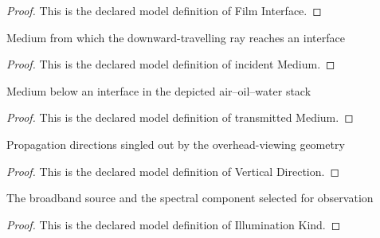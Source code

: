 \begin{proof}
  This is the declared model definition of Film Interface.
\end{proof}
\begin{definition}
  \label{def:physics:phyx-mini-0084:phyxminiproblems-problemphyxmini0084-filminterface-incidentmedium}
  Medium from which the downward-travelling ray reaches an interface
\end{definition}
\begin{proof}
  This is the declared model definition of incident Medium.
\end{proof}
\begin{definition}
  \label{def:physics:phyx-mini-0084:phyxminiproblems-problemphyxmini0084-filminterface-transmittedmedium}
  Medium below an interface in the depicted air--oil--water stack
\end{definition}
\begin{proof}
  This is the declared model definition of transmitted Medium.
\end{proof}
\begin{definition}
  \label{def:physics:phyx-mini-0084:phyxminiproblems-problemphyxmini0084-verticaldirection}
  Propagation directions singled out by the overhead-viewing geometry
\end{definition}
\begin{proof}
  This is the declared model definition of Vertical Direction.
\end{proof}
\begin{definition}
  \label{def:physics:phyx-mini-0084:phyxminiproblems-problemphyxmini0084-illuminationkind}
  The broadband source and the spectral component selected for observation
\end{definition}
\begin{proof}
  This is the declared model definition of Illumination Kind.
\end{proof}

